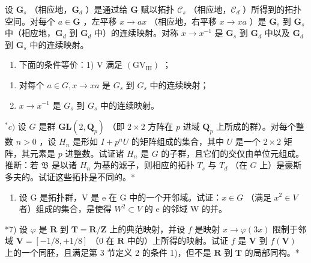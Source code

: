 设 \(\mathbf{G}_s\) （相应地，\(\mathbf{G}_d\) ）是通过给 \(\mathbf{G}\) 赋以拓扑 \(\mathcal{C}_s\) （相应地，\(\mathcal{C}_d\) ）所得到的拓扑空间。对每个 \(a \in \mathbf{G}\) ，左平移 \(x \to ax\) （相应地，右平移 \(x \to xa\) ）是 \(\mathbf{G}_s\) 到 \(\mathbf{G}_s\) 中（相应地，\(\mathbf{G}_d\) 到 \(\mathbf{G}_d\) 中）的连续映射。对称 \(x \to x^{-1}\) 是 \(\mathbf{G}_s\) 到 \(\mathbf{G}_d\) 中以及 \(\mathbf{G}_d\) 到 \(\mathbf{G}_s\) 中的连续映射。

\begin{enumerate}
\def\labelenumi{\alph{enumi})}
\setcounter{enumi}{1}
\tightlist
\item
  下面的条件等价：1) V 满足 \((\mathrm{GV}_{\mathrm{III}})\) ；
\end{enumerate}

\begin{enumerate}
\def\labelenumi{\arabic{enumi})}
\setcounter{enumi}{1}
\tightlist
\item
  对每个 \(a \in G, x \to xa\) 是 \(G_{s}\) 到 \(G_{s}\) 中的连续映射；
\item
  \(x \to x^{-1}\) 是 \(G_{s}\) 到 \(G_{s}\) 中的连续映射。
\end{enumerate}

\(^{*}c)\) 设 \(G\) 是群 \(\mathbf{GL}(2, \mathbf{Q}_p)\) （即 \(2 \times 2\) 方阵在 \(p\) 进域 \(\mathbf{Q}_p\) 上所成的群）。对每个整数 \(n > 0\) ，设 \(H_n\) 是形如 \(I + p^n U\) 的矩阵组成的集合，其中 \(U\) 是一个 \(2 \times 2\) 矩阵，其元素是 \(p\) 进整数。试证诸 \(H_n\) 是 \(G\) 的子群，且它们的交仅由单位元组成。推断：若 \(\mathfrak{B}\) 是以诸 \(H_n\) 为基的滤子，则相应的拓扑 \(T_s\) 与 \(T_d\) （在 \(G\) 上）是豪斯多夫的。试证这些拓扑是不同的。*

\begin{enumerate}
\def\labelenumi{\arabic{enumi})}
\setcounter{enumi}{5}
\tightlist
\item
  设 G 是拓扑群，V 是 e 在 G 中的一个开邻域。试证：\(x \in G\) （满足 \(x^{2} \in V\) 者）组成的集合，是使得 \(W^{2} \subset V\) 的 e 的邻域 W 的并。
\end{enumerate}

*7) 设 \(\varphi\) 是 \(\mathbf{R}\) 到 \(\mathbf{T} = \mathbf{R} / \mathbf{Z}\) 上的典范映射，并设 \(f\) 是映射 \(x \to \varphi(3x)\) 限制于邻域 \(\mathbf{V} = [-1/8, +1/8]\) （\(0\) 在 \(\mathbf{R}\) 中的）上所得的映射。试证 \(f\) 是 \(\mathbf{V}\) 到 \(f(\mathbf{V})\) 上的一个同胚，且满足第 3 节定义 2 的条件 1)，但不是 \(\mathbf{R}\) 到 \(\mathbf{T}\) 的局部同构。*

